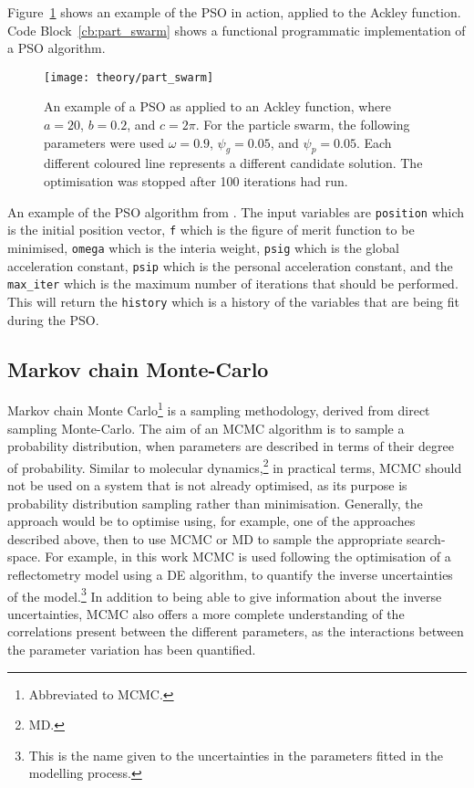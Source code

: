 Figure~\ref{fig:part_swarm} shows an example of the PSO in action, applied to the Ackley function.\autocite{ackley_connectionist_1987}
Code Block~\ref{cb:part_swarm} shows a functional programmatic implementation of a PSO algorithm.
%
\begin{figure}[t]
    \forcerectofloat
    \centering
    \texttt{[image: theory/part\_swarm]}
    \caption{An example of a PSO as applied to an Ackley function, where $a=20$, $b=0.2$, and $c=2\pi$. For the particle swarm, the following parameters were used $\omega=0.9$, $\psi_g=0.05$, and $\psi_p=0.05$. Each different coloured line represents a different candidate solution. The optimisation was stopped after \num{100} iterations had run.}
    \label{fig:part_swarm}
\end{figure}
%
\begin{listing}[t]
    \centering
    \caption{An example of the PSO algorithm from \cite{poli_analysis_2008}. The input variables are \texttt{position} which is the initial position vector, \texttt{f} which is the figure of merit function to be minimised, \texttt{omega} which is the interia weight, \texttt{psig} which is the global acceleration constant, \texttt{psip} which is the personal acceleration constant, and the \texttt{max\_iter} which is the maximum number of iterations that should be performed. This will return the \texttt{history} which is a history of the variables that are being fit during the PSO.}
    
    \label{cb:part_swarm}
\end{listing}
%

\subsection{Markov chain Monte-Carlo}
\label{sec:mcmc}
Markov chain Monte Carlo\footnote{Abbreviated to MCMC.} is a sampling methodology, derived from direct sampling Monte-Carlo.\autocite{krauth_statistical_2006}
The aim of an MCMC algorithm is to sample a probability distribution, when parameters are described in terms of their degree of probability.\autocite{sivia_data_2006}
Similar to molecular dynamics,\footnote{MD.} in practical terms, MCMC should not be used on a system that is not already optimised, as its purpose is probability distribution sampling rather than minimisation.
Generally, the approach would be to optimise using, for example, one of the approaches described above, then to use MCMC or MD to sample the appropriate search-space.
For example, in this work MCMC is used following the optimisation of a reflectometry model using a DE algorithm, to quantify the inverse uncertainties of the model.\footnote{This is the name given to the uncertainties in the parameters fitted in the modelling process.}
In addition to being able to give information about the inverse uncertainties, MCMC also offers a more complete understanding of the correlations present between the different parameters,\autocite{gilks_markov_1995} as the interactions between the parameter variation has been quantified.

